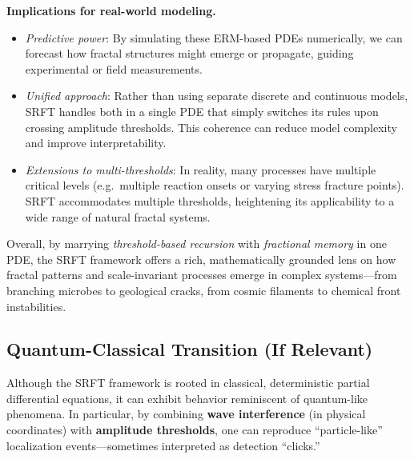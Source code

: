 \documentclass[12pt]{article}
\begin{document}
\medskip

\noindent
\textbf{Implications for real-world modeling.}
\begin{itemize}
    \item \emph{Predictive power}: By simulating these ERM-based PDEs numerically,
          we can forecast how fractal structures might emerge or propagate,
          guiding experimental or field measurements.
    \item \emph{Unified approach}: Rather than using separate discrete and
          continuous models, SRFT handles both in a single PDE that simply
          switches its rules upon crossing amplitude thresholds. This coherence
          can reduce model complexity and improve interpretability.
    \item \emph{Extensions to multi-thresholds}: In reality, many processes
          have multiple critical levels (e.g.\ multiple reaction onsets or
          varying stress fracture points). SRFT accommodates multiple thresholds,
          heightening its applicability to a wide range of natural fractal systems.
\end{itemize}

Overall, by marrying \emph{threshold-based recursion} with \emph{fractional
memory} in one PDE, the SRFT framework offers a rich, mathematically grounded
lens on how fractal patterns and scale-invariant processes emerge in complex
systems—from branching microbes to geological cracks, from cosmic filaments
to chemical front instabilities.

\subsection{Quantum-Classical Transition (If Relevant)}
\label{subsec:quantum_classical}

Although the SRFT framework is rooted in classical, deterministic partial differential
equations, it can exhibit behavior reminiscent of quantum-like phenomena. In particular,
by combining \textbf{wave interference} (in physical coordinates) with \textbf{amplitude
thresholds}, one can reproduce “particle-like” localization events—sometimes interpreted
as detection “clicks.”
\end{document}
